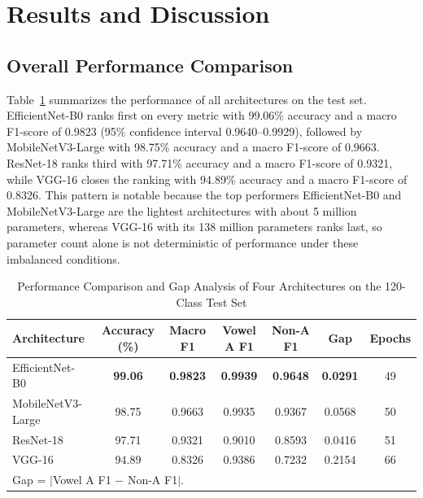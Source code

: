 \documentclass[conference]{IEEEtran}
\begin{document}
\section{Results and Discussion}
\label{sec:results}

\subsection{Overall Performance Comparison}

Table~\ref{tab:results} summarizes the performance of all architectures
on the test set.
EfficientNet-B0 ranks first on every metric with 99.06\% accuracy and
a macro F1-score of 0.9823 (95\% confidence interval 0.9640--0.9929),
followed by MobileNetV3-Large with 98.75\% accuracy and a macro
F1-score of 0.9663.
ResNet-18 ranks third with 97.71\% accuracy and a macro F1-score of
0.9321, while VGG-16 closes the ranking with 94.89\% accuracy and a
macro F1-score of 0.8326.
This pattern is notable because the top performers EfficientNet-B0 and
MobileNetV3-Large are the lightest architectures with about 5 million
parameters, whereas VGG-16 with its 138 million parameters ranks last,
so parameter count alone is not deterministic of performance under
these imbalanced conditions.

\begin{table}[t]
\caption{Performance Comparison and Gap Analysis of Four Architectures on the 120-Class Test Set}
\label{tab:results}
\begin{center}
\renewcommand{\arraystretch}{1.3}
\small
\begin{tabular}{lcccccc}
\toprule
\textbf{Architecture} & \textbf{Accuracy (\%)} & \textbf{Macro F1}
  & \textbf{Vowel A F1} & \textbf{Non-A F1}
  & \textbf{Gap} & \textbf{Epochs} \\
\midrule
EfficientNet-B0   & \textbf{99.06} & \textbf{0.9823} & \textbf{0.9939} & \textbf{0.9648} & \textbf{0.0291} & 49 \\
MobileNetV3-Large & 98.75          & 0.9663          & 0.9935          & 0.9367          & 0.0568          & 50 \\
ResNet-18         & 97.71          & 0.9321          & 0.9010          & 0.8593          & 0.0416          & 51 \\
VGG-16            & 94.89          & 0.8326          & 0.9386          & 0.7232          & 0.2154          & 66 \\
\bottomrule
\multicolumn{7}{l}{\footnotesize Gap = $|$Vowel A F1 $-$ Non-A F1$|$.}
\end{tabular}
\end{center}
\end{table}
\end{document}
